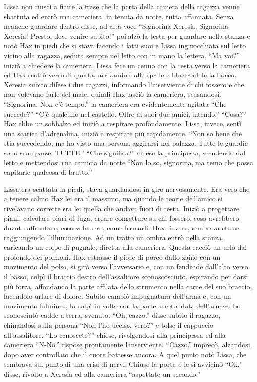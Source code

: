     Lissa non riuscì a finire la frase che la porta della camera della
    ragazza venne sbattuta ed entrò una cameriera, in tenuta da notte,
    tutta affannata. Senza neanche guardare dentro disse, ad alta voce
    ``Signorina Xeresia, Signorina Xeresia! Presto, deve venire subito!''
    poi alzò la testa per guardare nella stanza e notò Hax in piedi che si
    stava facendo i fatti suoi e Lissa inginocchiata sul letto vicino alla
    ragazza, seduta sempre nel letto con in mano la lettera. ``Ma voi?''
    iniziò a chiedere la cameriera. Lissa fece un cenno con la testa verso
    la cameriera ed Hax scattò verso di questa, arrivandole alle spalle e
    bloccandole la bocca. Xeresia subito difese i due ragazzi, informando
    l'inserviente di chi fossero e che non volevano farle del male, quindi
    Hax lasciò la cameriera, scusandosi. ``Signorina. Non c'è tempo.'' la
    cameriera era evidentemente agitata ``Che succede?'' ``C'è qualcuno nel
    castello. Oltre ai suoi due amici, intendo.'' ``Cosa?'' Hax ebbe un
    sobbalzo ed iniziò a respirare profondamente. Lissa, invece, sentì una
    scarica d'adrenalina, iniziò a respirare più rapidamente. ``Non so bene
    che stia succedendo, ma ho visto una persona aggirarsi nel palazzo.
    Tutte le guardie sono scomparse. TUTTE.'' ``Che significa?'' chiese la
    principessa, scendendo dal letto e mettendosi una camicia da notte
    ``Non lo so, signorina, ma temo che possa capitarle qualcosa di
    brutto.''

    Lissa era scattata in piedi, stava guardandosi in giro nervosamente.
    Era vero che a tenere calmo Hax lei era il massimo, ma quando le teorie
    dell'amico si rivelavano corrette era lei quella che andava fuori di
    testa. Iniziò a progettare piani, calcolare piani di fuga, creare
    congetture su chi fossero, cosa avrebbero dovuto affrontare, cosa
    volessero, come fermarli. Hax, invece, sembrava stesse raggiungendo
    l'illuminazione. Ad un tratto un ombra entrò nella stanza, caricando un
    colpo di pugnale, diretta alla cameriera. Questa cacciò un urlo dal
    profondo dei polmoni. Hax estrasse il piede di porco dallo zaino con un
    movimento del polso, si girò verso l'avversario e, con un fendende
    dall'alto verso il basso, colpì il braccio destro dell'assalitore
    sconoscosciuto, espirando per darsi più forza, affondando la parte affilata dello strumento nella
    carne del suo braccio, facendolo urlare di dolore. Subito cambiò
    impugnatura dell'arma e, con un movimento fulmineo, lo colpì in volto
    con la parte arrotondata dell'arnese. Lo sconosciutò cadde a terra,
    svenuto. ``Oh, cazzo.'' disse subito il ragazzo, chinandosi sulla
    persona ``Non l'ho ucciso, vero?'' e tolse il cappuccio all'assalitore.
    ``Lo conoscete?'' chiese, rivolgendosi alla principessa ed alla
    cameriera ``N-No.'' rispose prontamente l'inserviente. ``Cazzo.''
    imprecò, alzandosi, dopo aver controllato che il cuore battesse ancora.
    A quel punto notò Lissa, che sembrava sul punto di una crisi di nervi.
    Chiuse la porta e le si avvicinò ``Ok,'' disse, rivolto a Xeresia ed
    alla cameriera ``aspettate un secondo.''

